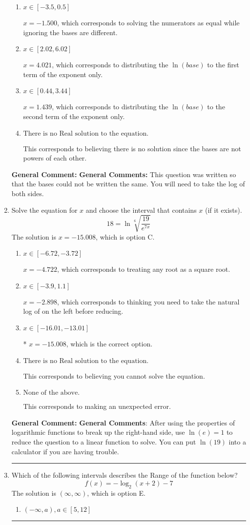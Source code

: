 \documentclass{extbook}[14pt]
\newcommand{\litem}[1]{\item #1

\rule{\textwidth}{0.4pt}}
\begin{document}
\begin{enumerate}
{\begin{enumerate}[label=\Alph*.]
* $x = -3.858$, which is the correct option.
\item \( x \in [-3.5, 0.5] \)

$x = -1.500$, which corresponds to solving the numerators as equal while ignoring the bases are different.
\item \( x \in [2.02, 6.02] \)

$x = 4.021$, which corresponds to distributing the $\ln(base)$ to the first term of the exponent only.
\item \( x \in [0.44, 3.44] \)

$x = 1.439$, which corresponds to distributing the $\ln(base)$ to the second term of the exponent only.
\item \( \text{There is no Real solution to the equation.} \)

This corresponds to believing there is no solution since the bases are not powers of each other.
\end{enumerate}

\textbf{General Comment:} \textbf{General Comments:} This question was written so that the bases could not be written the same. You will need to take the log of both sides.
}
\litem{
 Solve the equation for $x$ and choose the interval that contains $x$ (if it exists).
\[  18 = \ln{\sqrt[6]{\frac{19}{e^{7x}}}} \]The solution is \( x = -15.008 \), which is option C.\begin{enumerate}[label=\Alph*.]
\item \( x \in [-6.72, -3.72] \)

$x = -4.722$, which corresponds to treating any root as a square root.
\item \( x \in [-3.9, 1.1] \)

$x = -2.898$, which corresponds to thinking you need to take the natural log of on the left before reducing.
\item \( x \in [-16.01, -13.01] \)

* $x = -15.008$, which is the correct option.
\item \( \text{There is no Real solution to the equation.} \)

This corresponds to believing you cannot solve the equation.
\item \( \text{None of the above.} \)

This corresponds to making an unexpected error.
\end{enumerate}

\textbf{General Comment:} \textbf{General Comments}: After using the properties of logarithmic functions to break up the right-hand side, use $\ln(e) = 1$ to reduce the question to a linear function to solve. You can put $\ln(19)$ into a calculator if you are having trouble.
}
\litem{
Which of the following intervals describes the Range of the function below?
\[ f(x) = -\log_2{(x+2)}-7 \]The solution is \( (\infty, \infty) \), which is option E.\begin{enumerate}[label=\Alph*.]
\item \( (-\infty, a), a \in [5, 12] \)


\end{enumerate}}
\end{enumerate}
\end{document}
